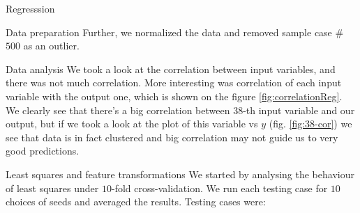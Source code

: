 \documentclass{article}
\begin{document}
\begin{section}{Regresssion}
\begin{subsection}{Data preparation}
Further, we normalized the data and removed sample case \#$500$ as an outlier.
\end{subsection}
\begin{subsection}{Data analysis}
We took a look at the correlation between input variables, and there was not much correlation. More interesting was correlation of each input variable with the output one, which is shown on the figure \ref{fig:correlationReg}. We clearly see that there's a big correlation between $38$-th input variable and our output, but if we took a look at the plot of this variable vs $y$ (fig. \ref{fig:38-cor}) we see that data is in fact clustered and big correlation may not guide us to very good predictions.
\begin{figure}[!h]
\center
{}
\hfill
{}
\caption{}
\end{figure}
\end{subsection}
\begin{subsection}{Least squares and feature transformations}
We started by analysing the behaviour of least squares under $10$-fold cross-validation. We run each testing case for $10$ choices of seeds and averaged the results. Testing cases were:

\end{subsection}
\end{section}
\end{document}

